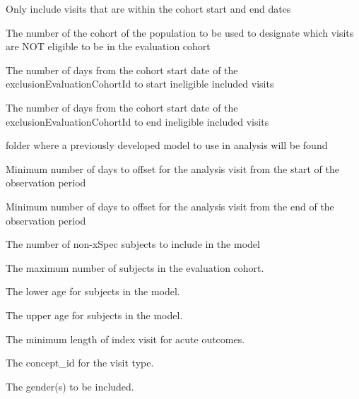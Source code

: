 \documentclass[a4paper]{book}
\begin{document}
\begin{Arguments}
\begin{ldescription}
\item[\code{duringInclusionEvaluationOnly}] Only include visits that are within the cohort start and end dates

\item[\code{exclusionEvaluationCohortId}] The number of the cohort of the population to be used to designate which visits
are NOT eligible to be in the evaluation cohort

\item[\code{exclusionEvaluationDaysFromStart}] The number of days from the cohort start date of the exclusionEvaluationCohortId
to start ineligible included visits

\item[\code{exclusionEvaluationDaysFromEnd}] The number of days from the cohort start date of the exclusionEvaluationCohortId
to end ineligible included visits

\item[\code{priorModelToUse}] folder where a previously developed model to use in analysis will be found

\item[\code{minimumOffsetFromStart}] Minimum number of days to offset for the analysis visit from the start of the observation period

\item[\code{minimumOffsetFromEnd}] Minimum number of days to offset for the analysis visit from the end of the observation period

\item[\code{modelBaseSampleSize}] The number of non-xSpec subjects to include in the model

\item[\code{baseSampleSize}] The maximum number of subjects in the evaluation cohort.

\item[\code{lowerAgeLimit}] The lower age for subjects in the model.

\item[\code{upperAgeLimit}] The upper age for subjects in the model.

\item[\code{visitLength}] The minimum length of index visit for acute outcomes.

\item[\code{visitType}] The concept\_id for the visit type.

\item[\code{gender}] The gender(s) to be included.


\end{ldescription}
\end{Arguments}
\end{document}
